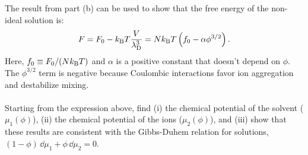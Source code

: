 \smallskip \subp
The result from part (b) can be used to show
that the free energy of the non-ideal solution is:
\begin{equation}
F = F_0 - k_{\rm B} T \frac{V}{\lambda_{\rm D}^3}
= N k_{\rm B} T \left( f_0 - \alpha \phi^{3/2} \right).
\label{eq:fVO}
\end{equation}
Here, $f_0 \equiv F_0 / (N k_{\rm B} T)$ and
$\alpha$ is a positive constant that doesn't depend on $\phi$.
The $\phi^{3/2}$ term is negative because
Coulombic interactions favor ion aggregation and
destabilize mixing. \\ \\ 
Starting from the expression above, find 
(i) the chemical potential of the solvent ($\mu_1(\phi)$),
(ii) the chemical potential of the ions ($\mu_2(\phi)$),
and (iii) show that these results are consistent
with the Gibbs-Duhem relation for solutions, 
$ (1-\phi)\,\dd \mu_1 + \phi\,\dd \mu_2 = 0 $.
